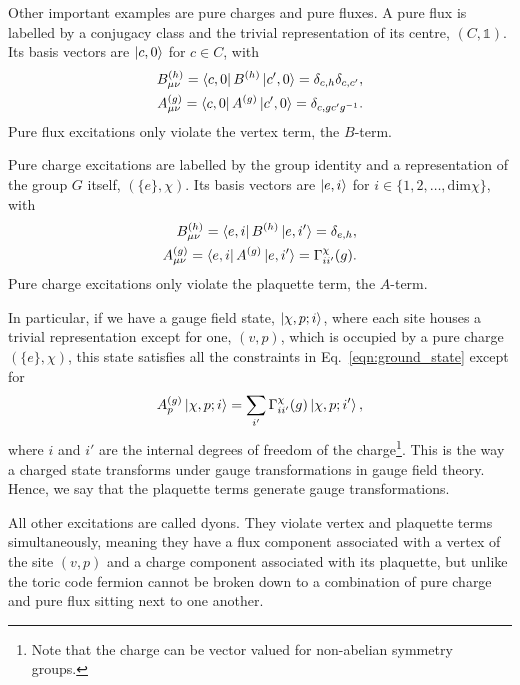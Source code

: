 \documentclass[two column]{article}
\begin{document}
Other important examples are pure charges and pure fluxes. A pure flux is labelled by a conjugacy class and the trivial representation of its centre, $(C, \mathbb{1})$. Its basis vectors are $\ket{c, 0}$ for $c \in C$, with
\begin{equation}
    \begin{split}
        B^{(h)}_{\mu\nu}=\bra{c, 0} B^{(h)} \ket{c', 0} = \delta_{c, h} \delta_{c, c'}, \\
        A^{(g)}_{\mu\nu} = \bra{c, 0} A^{(g)} \ket{c', 0} = \delta_{c,gc'g^{-1}}.
    \end{split}
\end{equation}
Pure flux excitations only violate the vertex term, the $B$-term.

Pure charge excitations are labelled by the group identity and a representation of the group $G$ itself, $(\{e\}, \chi)$. Its basis vectors are $\ket{e, i}$ for $i \in \{1, 2, \ldots, \text{dim}\chi\}$, with
\begin{equation}
    \begin{split}
        B^{(h)}_{\mu\nu}=\bra{e, i} B^{(h)} \ket{e, i'} = \delta_{e, h},\\
        A^{(g)}_{\mu\nu} = \bra{e, i} A^{(g)} \ket{e, i'} = \Gamma^\chi_{ii'}(g).
    \end{split}
\end{equation}
Pure charge excitations only violate the plaquette term, the $A$-term.


In particular, if we have a gauge field state, $\ket{\chi, p; i}$, where each site houses a trivial representation except for one, $(v, p)$, which is occupied by a pure charge $(\{e\}, \chi)$, this state satisfies all the constraints in Eq.~\eqref{eqn:ground_state} except for
\begin{equation}
    A_p^{(g)}\ket{\chi, p; i} = \sum_{i'} \Gamma^\chi_{ii'}(g)\ket{\chi, p; i'},\label{eqn:tranfs}
\end{equation}
where $i$ and $i'$ are the internal degrees of freedom of the charge\footnote{Note that the charge can be vector valued for non-abelian symmetry groups.}.
This is the way a charged state transforms under gauge transformations in gauge field theory. Hence, we say that the plaquette terms generate gauge transformations.

All other excitations are called dyons. They violate vertex and plaquette terms simultaneously, meaning they have a flux component associated with a vertex of the site $(v,p)$ and a charge component associated with its plaquette, but unlike the toric code fermion cannot be broken down to a combination of pure charge and pure flux sitting next to one another.
\end{document}
